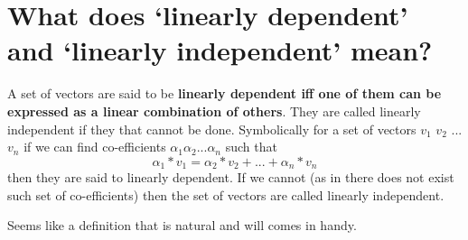 \documentclass[../main.tex]{subfiles}
\begin{document}
\section{What does `linearly dependent' and `linearly independent' mean?}

A set of vectors are said to be \textbf{linearly dependent iff one of them can be expressed as a linear combination of others}. They are called linearly independent if they that cannot be done. Symbolically for a set of vectors $ v_1 $ $ v_2 $ ... $ v_n $ if we can find co-efficients $ \alpha_1 \alpha_2 ... \alpha_n $ such that \[ \alpha_1 * v_1  = \alpha_2 * v_2 + ... + \alpha_n * v_n \] then they are said to linearly dependent. If we cannot (as in there does not exist such set of co-efficients) then the set of vectors are called linearly independent.

Seems like a definition that is natural and will comes in handy.

\pagebreak
\end{document}
